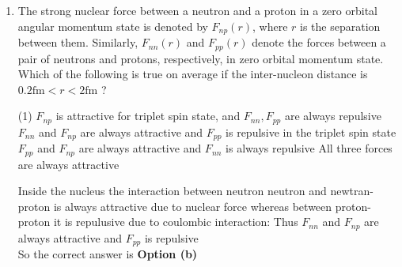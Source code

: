 \begin{enumerate}
	{}
	\begin{tasks}(2)
		\task[\textbf{a.}]Linear combination of a singlet and a triplet
		\task[\textbf{b.}]Singlet
		\task[\textbf{c.}]Triplet
		\task[\textbf{d.}]Doublet 
	\end{tasks}
	\begin{answer}
		\begin{align*}
		&\text{ Parity must conserve intersections}\\
		&\pi+d \rightarrow n+n\\
		&\text{The parity of the initial state is}\\
		&(-1)^l P_\pi P_d=(-1)^1(-1)(+1)=+1\\
		&\text{The parity of the final state is}\\
		&(-1)^l P_n P_n=(-1)^l(+1)(+1)=(-1)^l=1\qquad \because l=0,2, \ldots .\\
		&\text{word or phrase}
		\end{align*}
		So the correct answer is \textbf{Option (b)}
	\end{answer}
	\item  The strong nuclear force between a neutron and a proton in a zero orbital angular momentum state is denoted by $F_{n p}(r)$, where $r$ is the separation between them. Similarly, $F_{n n}(r)$ and $F_{p p}(r)$ denote the forces between a pair of neutrons and protons, respectively, in zero orbital momentum state. Which of the following is true on average if the inter-nucleon distance is $0.2 \mathrm{fm}<r<2 \mathrm{fm}$ ?
	\begin{tasks}(1)
		\task[\textbf{a.}]$F_{n p}$ is attractive for triplet spin state, and $F_{n n}, F_{p p}$ are always repulsive
		\task[\textbf{b.}]$F_{n n}$ and $F_{n p}$ are always attractive and $F_{p p}$ is repulsive in the triplet spin state
		\task[\textbf{c.}]$F_{p p}$ and $F_{n p}$ are always attractive and $F_{n n}$ is always repulsive
		\task[\textbf{d.}]All three forces are always attractive 
	\end{tasks}
	\begin{answer}
		Inside the nucleus the interaction between neutron neutron and newtran-proton is always attractive due to nuclear force whereas between proton-proton it is repulusive due to coulombic interaction:
		Thus $F_{n n}$ and $F_{n p}$ are always attractive and $F_{p p}$ is repulsive\\
		So the correct answer is \textbf{Option (b)}
	\end{answer}
\end{enumerate}
